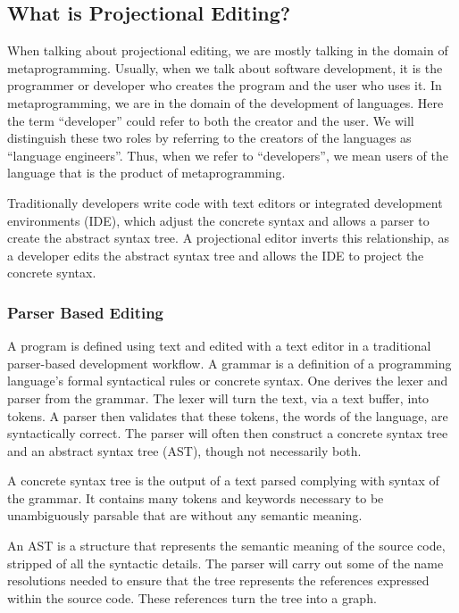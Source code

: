 \subsection{What is Projectional Editing?}
\label{section:WhatIsPE}

When talking about projectional editing, we are mostly talking in the domain of metaprogramming.
Usually, when we talk about software development, it is the programmer or developer who creates the program and the user who uses it. 
In metaprogramming, we are in the domain of the development of languages.
Here the term ``developer'' could refer to both the creator and the user.
We will distinguish these two roles by referring to the creators of the languages as ``language engineers''.
Thus, when we refer to ``developers'', we mean users of the language that is the product of metaprogramming. 

Traditionally developers write code with text editors or integrated development environments (IDE), which adjust the concrete syntax and allows a parser to create the abstract syntax tree.
A projectional editor inverts this relationship, as a developer edits the abstract syntax tree and allows the IDE to project the concrete syntax.

\subsubsection{Parser Based Editing}

A program is defined using text and edited with a text editor in a traditional parser-based development workflow.
A grammar is a definition of a programming language's formal syntactical rules or concrete syntax.
One derives the lexer and parser from the grammar.
The lexer will turn the text, via a text buffer, into tokens. 
A parser then validates that these tokens, the words of the language, are syntactically correct.
The parser will often then construct a concrete syntax tree and an abstract syntax tree (AST), though not necessarily both.

A concrete syntax tree is the output of a text parsed complying with syntax of the grammar.
It contains many tokens and keywords necessary to be unambiguously parsable that are without any semantic meaning.

An AST is a structure that represents the semantic meaning of the source code, stripped of all the syntactic details.
The parser will carry out some of the name resolutions needed to ensure that the tree represents the references expressed within the source code.
These references turn the tree into a graph.

